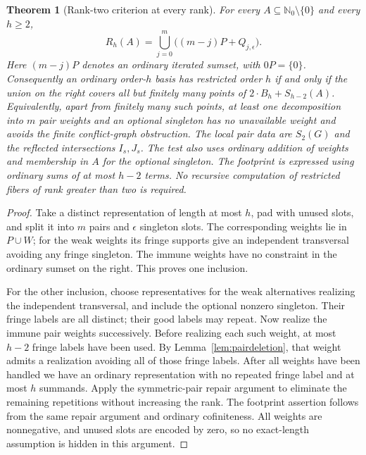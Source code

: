 \documentclass[11pt]{article}
\newtheorem{theorem}{Theorem}[section]
\theoremstyle{remark}\newtheorem{remark}[theorem]{Remark}
\newcommand{\N}{\mathbb N_0}
\begin{document}
\begin{theorem}[Rank-two criterion at every rank]\label{thm:pairdirect}
For every $A\subseteq\N\setminus\{0\}$ and every $h\ge2$,
\begin{equation}\label{eq:pairdirect}
 R_h(A)=\bigcup_{j=0}^{m}\bigl((m-j)P+Q_{j,\epsilon}\bigr).
\end{equation}
Here $(m-j)P$ denotes an \emph{ordinary} iterated sumset, with $0P=\{0\}$. Consequently an ordinary order-$h$ basis has restricted order $h$ if and only if the union on the right covers all but finitely many points of $2\cdot B_h+S_{h-2}(A)$. Equivalently, apart from finitely many such points, at least one decomposition into $m$ pair weights and an optional singleton has no unavailable weight and avoids the finite conflict-graph obstruction. The local pair data are $S_2(G)$ and the reflected intersections $I_s,J_s$. The test also uses ordinary addition of weights and membership in $A$ for the optional singleton. The footprint is expressed using ordinary sums of at most $h-2$ terms. No recursive computation of restricted fibers of rank greater than two is required.
\end{theorem}
\begin{proof}
Take a distinct representation of length at most $h$, pad with unused slots, and split it into $m$ pairs and $\epsilon$ singleton slots. The corresponding weights lie in $P\cup W$; for the weak weights its fringe supports give an independent transversal avoiding any fringe singleton. The immune weights have no constraint in the ordinary sumset on the right. This proves one inclusion.

For the other inclusion, choose representatives for the weak alternatives realizing the independent transversal, and include the optional nonzero singleton. Their fringe labels are all distinct; their good labels may repeat. Now realize the immune pair weights successively. Before realizing each such weight, at most $h-2$ fringe labels have been used. By Lemma~\ref{lem:pairdeletion}, that weight admits a realization avoiding all of those fringe labels. After all weights have been handled we have an ordinary representation with no repeated fringe label and at most $h$ summands. Apply the symmetric-pair repair argument to eliminate the remaining repetitions without increasing the rank. The footprint assertion follows from the same repair argument and ordinary cofiniteness. All weights are nonnegative, and unused slots are encoded by zero, so no exact-length assumption is hidden in this argument.
\end{proof}
\end{document}
